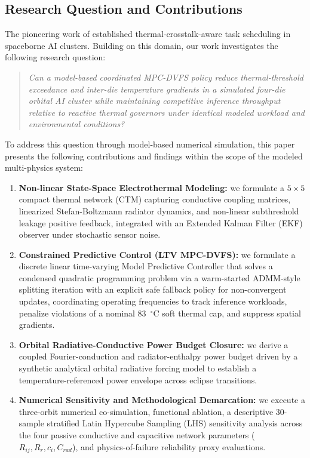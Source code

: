 \documentclass[a4paper,fleqn]{cas-dc}
\begin{document}
\subsection{Research Question and Contributions}
The pioneering work of \citet{chen2026hotai} established thermal-crosstalk-aware task scheduling in spaceborne AI clusters. Building on this domain, our work investigates the following research question:
\begin{quote}
\textit{Can a model-based coordinated MPC-DVFS policy reduce thermal-threshold exceedance and inter-die temperature gradients in a simulated four-die orbital AI cluster while maintaining competitive inference throughput relative to reactive thermal governors under identical modeled workload and environmental conditions?}
\end{quote}
To address this question through model-based numerical simulation, this paper presents the following contributions and findings within the scope of the modeled multi-physics system:
\begin{enumerate}
\item \textbf{Non-linear State-Space Electrothermal Modeling:} we formulate a $5\times5$ compact thermal network (CTM) capturing conductive coupling matrices, linearized Stefan-Boltzmann radiator dynamics, and non-linear subthreshold leakage positive feedback, integrated with an Extended Kalman Filter (EKF) observer under stochastic sensor noise.
\item \textbf{Constrained Predictive Control (LTV MPC-DVFS):} we formulate a discrete linear time-varying Model Predictive Controller that solves a condensed quadratic programming problem via a warm-started ADMM-style splitting iteration with an explicit safe fallback policy for non-convergent updates, coordinating operating frequencies to track inference workloads, penalize violations of a nominal 83~$^\circ$C soft thermal cap, and suppress spatial gradients.
\item \textbf{Orbital Radiative-Conductive Power Budget Closure:} we derive a coupled Fourier-conduction and radiator-enthalpy power budget driven by a synthetic analytical orbital radiative forcing model to establish a temperature-referenced power envelope across eclipse transitions.
\item \textbf{Numerical Sensitivity and Methodological Demarcation:} we execute a three-orbit numerical co-simulation, functional ablation, a descriptive 30-sample stratified Latin Hypercube Sampling (LHS) sensitivity analysis across the four passive conductive and capacitive network parameters ($R_{ij}, R_r, c_i, C_{rad}$), and physics-of-failure reliability proxy evaluations.
\end{enumerate}
\end{document}
